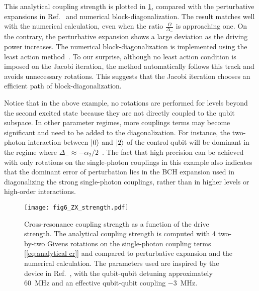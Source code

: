 \documentclass[%
 reprint,
 amsmath,amssymb,
 aps,
pra,
noeprint,
superscriptaddress,
]{revtex4-2}
\begin{document}
This analytical coupling strength is plotted in \cref{fig:zx coupling strength}, compared with the perturbative expansions in Ref.~\cite{Magesan2020} and numerical block-diagonalization.
The result matches well with the numerical calculation, even when the ratio $\frac{\Omega}{\Delta_-}$ is approaching one.
On the contrary, the perturbative expansion shows a large deviation as the driving power increases.
The numerical block-diagonalization is implemented using the least action method~\cite{Cederbaum1989,Magesan2020,Xu2020zz}.
To our surprise, although no least action condition is imposed on the Jacobi iteration, the method automatically follows this track and avoids unnecessary rotations.
This suggests that the Jacobi iteration chooses an efficient path of block-diagonalization.

Notice that in the above example, no rotations are performed for levels beyond the second excited state because they are not directly coupled to the qubit subspace.
In other parameter regimes, more couplings terms may become significant and need to be added to the diagonalization.
For instance, the two-photon interaction between $\ket{0}$ and $\ket{2}$ of the control qubit will be dominant in the regime where $\Delta_- \approx -\alpha_2/2$~\cite{Malekakhlagh2020}.
The fact that high precision can be achieved with only rotations on the single-photon couplings in this example also indicates that the dominant error of perturbation lies in the BCH expansion used in diagonalizing the strong single-photon couplings, rather than in higher levels or high-order interactions.


\begin{figure}
    \texttt{[image: fig6\_ZX\_strength.pdf]}
    \caption{
        Cross-resonance coupling strength as a function of the drive strength.
        The analytical coupling strength is computed with 4 two-by-two Givens rotations on the single-photon coupling terms [\cref{eq:analytical cr}] and compared to perturbative expansion and the numerical calculation. The parameters used are inspired by the device in Ref.~\cite{kandala2021}, with the qubit-qubit detuning approximately 60~MHz and an effective qubit-qubit coupling $-3$~MHz.
        }
    \label{fig:zx coupling strength}
\end{figure}
\end{document}
